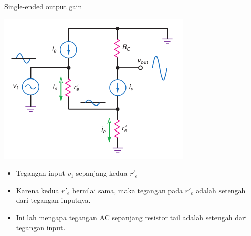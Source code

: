 \documentclass[aspectratio=169]{beamer}
\begin{document}
\begin{frame}{Single-ended output gain}
	\begin{multicols}{2}
		\begin{center}
			\includegraphics[height=0.7\textheight]{gambar/01.simplified_ac-equivalent_circuit}
		\end{center}
		\columnbreak
		\begin{itemize}
			\item Tegangan input $ v_1 $ sepanjang kedua $ r'_e $
			\item Karena kedua $ r'_e $ bernilai sama, maka tegangan pada $ r'_e $ adalah setengah dari tegangan inputnya.
			\item Ini lah mengapa tegangan AC sepanjang resistor tail adalah setengah dari tegangan input.
		\end{itemize}
	\end{multicols}
\end{frame}
\end{document}
